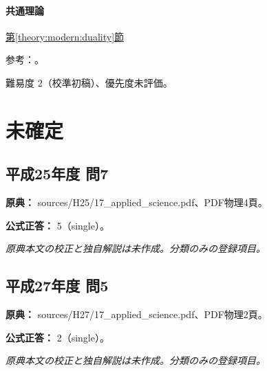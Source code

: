 \paragraph{共通理論} \hyperref[theory:modern:duality]{第\ref*{theory:modern:duality}節}

\par 参考：\cite{os_photoelectric,os_matter}。

\par 難易度 2（校準初稿）、優先度未評価。

\section{未確定}

\subsection{平成25年度 問7}
\label{q:h25-reg-applied-07}

\noindent\textbf{原典：} sources/H25/17\_applied\_science.pdf、PDF物理4頁。

\textbf{公式正答：} 5（single）。

\par\textit{原典本文の校正と独自解説は未作成。分類のみの登録項目。}

\subsection{平成27年度 問5}
\label{q:h27-reg-applied-05}

\noindent\textbf{原典：} sources/H27/17\_applied\_science.pdf、PDF物理2頁。

\textbf{公式正答：} 2（single）。

\par\textit{原典本文の校正と独自解説は未作成。分類のみの登録項目。}
